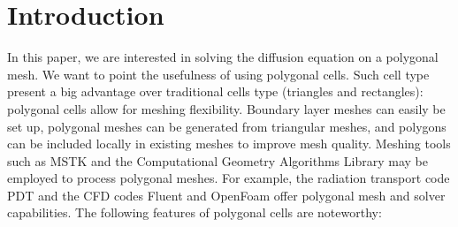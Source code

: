 \section{Introduction} \label{sec_intro}
In this paper, we are interested in solving the diffusion equation on a
polygonal mesh. We want to point the usefulness of using polygonal cells. Such
cell type present a big advantage over traditional cells type (triangles and
rectangles): polygonal cells allow for meshing flexibility. Boundary layer meshes 
can easily be set up, polygonal meshes can be generated from triangular meshes, 
and polygons can be included locally in existing meshes to improve mesh quality. 
Meshing tools such as MSTK \cite{mstk} and the Computational Geometry Algorithms 
Library \cite{cgal} may be employed to process polygonal meshes. For 
example, the radiation transport code PDT and the CFD codes Fluent and OpenFoam 
offer polygonal mesh and solver capabilities. The following features of polygonal
cells are noteworthy:
